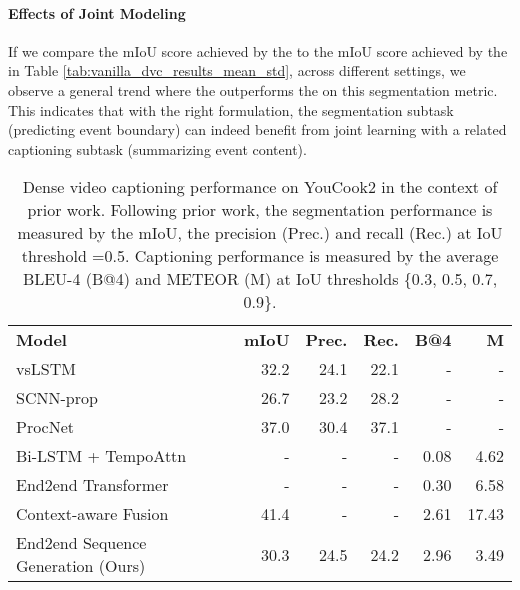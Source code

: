 \documentclass[11pt]{article}
\begin{document}
\paragraph{Effects of Joint Modeling}
If we compare the mIoU score achieved by the \segcap to the mIoU score achieved by the \segonly in Table \ref{tab:vanilla_dvc_results_mean_std},
across different settings,
we observe a general trend where the \segcap outperforms the \segonly on this segmentation metric.
This indicates that with the right formulation, the segmentation subtask (predicting event boundary) can indeed benefit from joint learning with a related captioning subtask (summarizing event content).

\begin{table}[tbp]
\begin{adjustbox}{width=\linewidth,center}
\begin{tabular}{l  r r r r r}
\cmidrule[\heavyrulewidth]{1-6}
\textbf{Model}   & \textbf{mIoU}  & \textbf{Prec.}  & \textbf{Rec.}      &   \textbf{B@4}    &   \textbf{M}   \\ 
\cmidrule[\heavyrulewidth]{1-6}
vsLSTM~\citep{Zhang2016VideoSW}                 & 32.2  & 24.1  & 22.1  & -  & -  \\
SCNN-prop~\citep{Shou2016TemporalAL}            & 26.7  & 23.2  & 28.2  & -  & -  \\
ProcNet~\citep{Zhou2018TowardsAL}               & 37.0  & 30.4  & 37.1  & -  & -  \\
Bi-LSTM + TempoAttn~\citep{Zhou2018EndtoEndDV} & -  & -  & -  & 0.08  & 4.62  \\
End2end Transformer~\citep{Zhou2018EndtoEndDV} & -  & -  & -  & 0.30  & 6.58  \\
Context-aware Fusion~\citep{Shi2019DensePC}& 41.4  & -  & -  & 2.61  & 17.43  \\
\cmidrule{1-6}
End2end Sequence Generation (Ours)    &   30.3 & 	24.5 & 	24.2 & 	2.96 & 	3.49 \\
\cmidrule[\heavyrulewidth]{1-6}
\end{tabular}
\end{adjustbox}
\caption{Dense video captioning performance on YouCook2 in the context of prior work. Following prior work, the segmentation performance is measured by the mIoU, the precision (Prec.) and recall (Rec.) at IoU threshold =0.5.
Captioning performance is measured by the average BLEU-4 (B@4) and METEOR (M) at IoU thresholds \{0.3, 0.5, 0.7, 0.9\}.
}
\label{tab:prior_work_youcook2}
\end{table}
\end{document}
